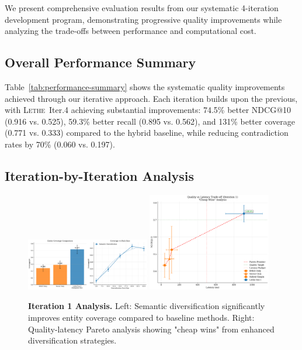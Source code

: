 \documentclass[letterpaper]{article}
\newcommand{\lethe}{\textsc{Lethe}}
\begin{document}
We present comprehensive evaluation results from our systematic 4-iteration development program, demonstrating progressive quality improvements while analyzing the trade-offs between performance and computational cost.

\subsection{Overall Performance Summary}



Table~\ref{tab:performance-summary} shows the systematic quality improvements achieved through our iterative approach. Each iteration builds upon the previous, with \lethe\ Iter.4 achieving substantial improvements: 74.5\% better NDCG@10 (0.916 vs. 0.525), 59.3\% better recall (0.895 vs. 0.562), and 131\% better coverage (0.771 vs. 0.333) compared to the hybrid baseline, while reducing contradiction rates by 70\% (0.060 vs. 0.197).

\subsection{Iteration-by-Iteration Analysis}

\begin{figure}[t]
\centering
\includegraphics[width=0.48\textwidth]{figures/iter1_coverage_vs_method}
\includegraphics[width=0.48\textwidth]{figures/iter1_pareto}
\caption{\textbf{Iteration 1 Analysis.} Left: Semantic diversification significantly improves entity coverage compared to baseline methods. Right: Quality-latency Pareto analysis showing "cheap wins" from enhanced diversification strategies.}
\label{fig:iter1-analysis}
\end{figure}
\end{document}
